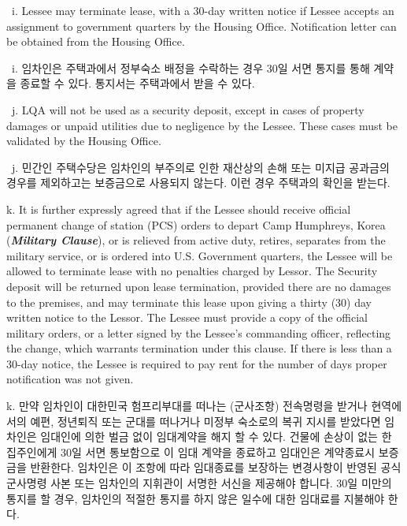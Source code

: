 \documentclass[10pt, letterpaper]{article}
\newcommand{\ul}[1]{\underline{\makebox[#1]{}}}
\newcommand{\init}{\ul{1cm}\ }
\begin{document}
\vspace{3pt}

\init i. Lessee may terminate lease, with a 30-day written notice if Lessee accepts an assignment to government quarters by the Housing Office. Notification letter can be obtained from the Housing Office.

\init i. 임차인은 주택과에서 정부숙소 배정을 수락하는 경우 30일 서면 통지를 통해 계약을 종료할 수 있다. 통지서는 주택과에서 받을 수 있다.

\vspace{3pt}

\init j. LQA will not be used as a security deposit, except in cases of property damages or unpaid utilities due to negligence by the Lessee. These cases must be validated by the Housing Office.

\init j. 민간인 주택수당은 임차인의 부주의로 인한 재산상의 손해 또는 미지급 공과금의 경우를 제외하고는 보증금으로 사용되지 않는다. 이런 경우 주택과의 확인을 받는다.

\vspace{3pt}

k. It is further expressly agreed that if the Lessee should receive official permanent change of station (PCS) orders to depart Camp Humphreys, Korea (\textbf{\textit{Military Clause}}), or is relieved from active duty, retires, separates from the military service, or is ordered into U.S. Government quarters, the Lessee will be allowed to terminate lease with no penalties charged by Lessor. The Security deposit will be returned upon lease termination, provided there are no damages to the premises, and may terminate this lease upon giving a thirty (30) day written notice to the Lessor. The Lessee must provide a copy of the official military orders, or a letter signed by the Lessee's commanding officer, reflecting the change, which warrants termination under this clause. If there is less than a 30-day notice, the Lessee is required to pay rent for the number of days proper notification was not given.

k. 만약 임차인이 대한민국 험프리부대를 떠나는 (군사조항) 전속명령을 받거나 현역에서의 예편, 정년퇴직 또는 군대를 떠나거나 미정부 숙소로의 복귀 지시를 받았다면 임차인은 임대인에 의한 벌금 없이 임대계약을 해지 할 수 있다. 건물에 손상이 없는 한 집주인에게 30일 서면 통보함으로 이 임대 계약을 종료하고 임대인은 계약종료시 보증금을 반환한다. 임차인은 이 조항에 따라 임대종료를 보장하는 변경사항이 반영된 공식 군사명령 사본 또는 임차인의 지휘관이 서명한 서신을 제공해야 합니다. 30일 미만의 통지를 할 경우, 임차인의 적절한 통지를 하지 않은 일수에 대한 임대료를 지불해야 한다.
\end{document}
